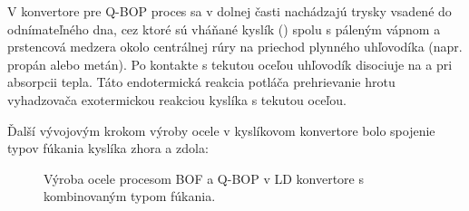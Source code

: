 V konvertore pre Q-BOP proces sa v dolnej časti nachádzajú trysky vsadené do odnímateľného dna, cez ktoré sú vháňané kyslík () spolu s páleným vápnom a prstencová medzera okolo centrálnej rúry na priechod plynného uhľovodíka (napr. propán alebo metán). Po kontakte s tekutou oceľou uhľovodík disociuje na  a  pri absorpcii tepla. Táto endotermická reakcia potláča prehrievanie hrotu vyhadzovača exotermickou reakciou kyslíka s tekutou oceľou.

Ďalší vývojovým krokom výroby ocele v kyslíkovom konvertore bolo spojenie typov fúkania kyslíka zhora a zdola:

\begin{figure}[h!tbp]
\centering
{}
\hfill
{}
\caption{Výroba ocele procesom BOF a Q-BOP v LD konvertore s kombinovaným typom fúkania.}
\label{o:4}
\end{figure}

